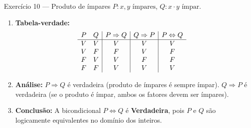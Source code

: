 \documentclass[12pt]{article}
\begin{document}
\begin{block}{Exercício 10 — Produto de ímpares}
$P: x, y \text{ ímpares}$, $Q: x \cdot y \text{ ímpar}$.
\begin{enumerate}
    \item \textbf{Tabela-verdade:}
    \[
    \begin{array}{c c | c | c | c}
    P & Q & P \Rightarrow Q & Q \Rightarrow P & P \Leftrightarrow Q \\
    \hline
    V & V & V & V & V \\
    V & F & F & V & F \\
    F & V & V & F & F \\
    F & F & V & V & V
    \end{array}
    \]
    \item \textbf{Análise:} $P \Rightarrow Q$ é verdadeira (produto de ímpares é sempre ímpar). $Q \Rightarrow P$ é verdadeira (se o produto é ímpar, ambos os fatores devem ser ímpares).
    \item \textbf{Conclusão:} A bicondicional $P \Leftrightarrow Q$ é \textbf{Verdadeira}, pois $P$ e $Q$ são logicamente equivalentes no domínio dos inteiros.
\end{enumerate}
\end{block}
\end{document}
